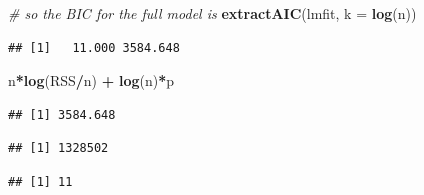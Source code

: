 \documentclass[
]{book}
\newenvironment{Shaded}{\begin{snugshade}}{\end{snugshade}}
\newcommand{\CommentTok}[1]{\textcolor[rgb]{0.56,0.35,0.01}{\textit{#1}}}
\newcommand{\DataTypeTok}[1]{\textcolor[rgb]{0.13,0.29,0.53}{#1}}
\newcommand{\DecValTok}[1]{\textcolor[rgb]{0.00,0.00,0.81}{#1}}
\newcommand{\KeywordTok}[1]{\textcolor[rgb]{0.13,0.29,0.53}{\textbf{#1}}}
\newcommand{\NormalTok}[1]{#1}
\newcommand{\OperatorTok}[1]{\textcolor[rgb]{0.81,0.36,0.00}{\textbf{#1}}}
\newcommand{\StringTok}[1]{\textcolor[rgb]{0.31,0.60,0.02}{#1}}
\begin{document}
\begin{Shaded}
\begin{Highlighting}[]
    \CommentTok{# so the BIC for the full model is }
    \KeywordTok{extractAIC}\NormalTok{(lmfit, }\DataTypeTok{k =} \KeywordTok{log}\NormalTok{(n))}
\end{Highlighting}
\end{Shaded}

\begin{verbatim}
## [1]   11.000 3584.648
\end{verbatim}

\begin{Shaded}
\begin{Highlighting}[]
\NormalTok{    n}\OperatorTok{*}\KeywordTok{log}\NormalTok{(RSS}\OperatorTok{/}\NormalTok{n) }\OperatorTok{+}\StringTok{ }\KeywordTok{log}\NormalTok{(n)}\OperatorTok{*}\NormalTok{p}
\end{Highlighting}
\end{Shaded}

\begin{verbatim}
## [1] 3584.648
\end{verbatim}

\begin{Shaded}
\end{Shaded}

\begin{verbatim}
## [1] 1328502
\end{verbatim}

\begin{Shaded}
\end{Shaded}

\begin{verbatim}
## [1] 11
\end{verbatim}
\end{document}
